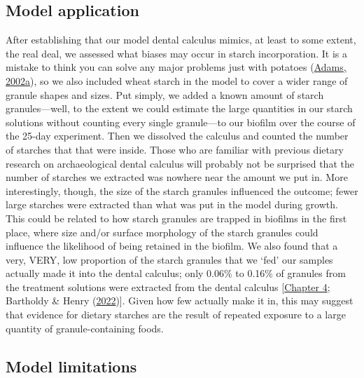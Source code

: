 \documentclass[
  letterpaper,
]{book}
\begin{document}
\hypertarget{model-application}{%
\subsection{Model application}\label{model-application}}

After establishing that our model dental calculus mimics, at least to
some extent, the real deal, we assessed what biases may occur in starch
incorporation. It is a mistake to think you can solve any major problems
just with potatoes (\protect\hyperlink{ref-adamsLifeUniverse2002}{Adams,
2002a}), so we also included wheat starch in the model to cover a wider
range of granule shapes and sizes. Put simply, we added a known amount
of starch granules---well, to the extent we could estimate the large
quantities in our starch solutions without counting every single
granule---to our biofilm over the course of the 25-day experiment. Then
we dissolved the calculus and counted the number of starches that that
were inside. Those who are familiar with previous dietary research on
archaeological dental calculus will probably not be surprised that the
number of starches we extracted was nowhere near the amount we put in.
More interestingly, though, the size of the starch granules influenced
the outcome; fewer large starches were extracted than what was put in
the model during growth. This could be related to how starch granules
are trapped in biofilms in the first place, where size and/or surface
morphology of the starch granules could influence the likelihood of
being retained in the biofilm. We also found that a very, VERY, low
proportion of the starch granules that we `fed' our samples actually
made it into the dental calculus; only 0.06\% to 0.16\% of granules from
the treatment solutions were extracted from the dental calculus
{[}\protect\hyperlink{byoc-starch}{Chapter 4}; Bartholdy \& Henry
(\protect\hyperlink{ref-bartholdyInvestigatingBiases2022}{2022}){]}.
Given how few actually make it in, this may suggest that evidence for
dietary starches are the result of repeated exposure to a large quantity
of granule-containing foods.

\hypertarget{disc-model-limitations}{%
\subsection{Model limitations}\label{disc-model-limitations}}
\end{document}
